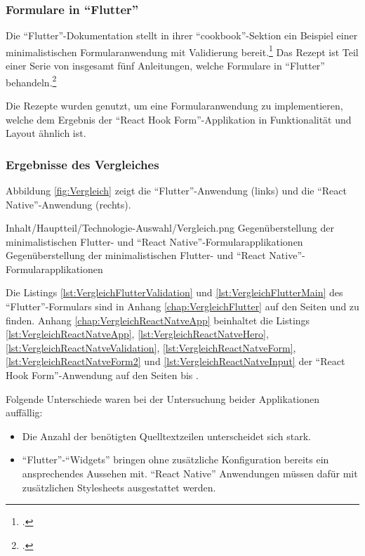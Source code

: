 \subsubsection{Formulare in \enquote{Flutter}}
Die \enquote{Flutter}-Dokumentation stellt in ihrer \enquote{cookbook}-Sektion ein Beispiel einer minimalistischen Formularanwendung mit Validierung bereit.\footcite[Vgl.][]{BuildAFormWithValidation}
Das Rezept ist Teil einer Serie von insgesamt fünf Anleitungen, welche Formulare in \enquote{Flutter} behandeln.\footcite[Vgl.][]{FormsFlutter}

Die Rezepte wurden genutzt,
um eine Formularanwendung zu implementieren,
welche dem Ergebnis der \enquote{React Hook Form}-Applikation in Funktionalität und Layout ähnlich ist.

\clearpage
\subsubsection{Ergebnisse des Vergleiches}


Abbildung \ref{fig:Vergleich} zeigt die \enquote{Flutter}-Anwendung (links) und die \enquote{React Native}-Anwendung (rechts).


\begin{alexfigure}{Inhalt/Hauptteil/Technologie-Auswahl/Vergleich.png}
   {Gegenüberstellung der minimalistischen {Flutter}- und \enquote{React Native}-Formular\-ap\-pli\-ka\-ti\-on\-en}
   {Gegenüberstellung der minimalistischen {Flutter}- und \enquote{React Native}-Formular\-ap\-pli\-ka\-ti\-on\-en}
 
   \label{fig:Vergleich}
 
 \end{alexfigure}

 Die Listings \ref{lst:VergleichFlutterValidation} und \ref{lst:VergleichFlutterMain}
 des \enquote{Flutter}-Formulars sind in Anhang \ref{chap:VergleichFlutter}
 auf den Seiten \pageref{lst:VergleichFlutterValidation} und \pageref{lst:VergleichFlutterMain} zu finden.
 Anhang \ref{chap:VergleichReactNatveApp} beinhaltet die Listings
 \ref{lst:VergleichReactNatveApp}, \ref{lst:VergleichReactNatveHero}, \ref{lst:VergleichReactNatveValidation},
 \ref{lst:VergleichReactNatveForm},  \ref{lst:VergleichReactNatveForm2} und \ref{lst:VergleichReactNatveInput} 
 der \enquote{React Hook Form}-Anwendung auf den Seiten \pageref{lst:VergleichReactNatveApp} bis \pageref{lst:VergleichReactNatveInput}.


Folgende Unterschiede waren bei der Untersuchung beider Applikationen auffällig:
\begin{itemize}[topsep=0pt,itemsep=-1ex,partopsep=1ex,parsep=1ex]
   \item Die Anzahl der benötigten Quelltextzeilen unterscheidet sich stark.
   \item \enquote{Flutter}-\enquote{Widgets} bringen ohne zusätzliche Konfiguration bereits ein ansprechendes Aussehen mit. \enquote{React Native} Anwendungen müssen dafür mit zusätzlichen Stylesheets ausgestattet werden. 
\end{itemize}

